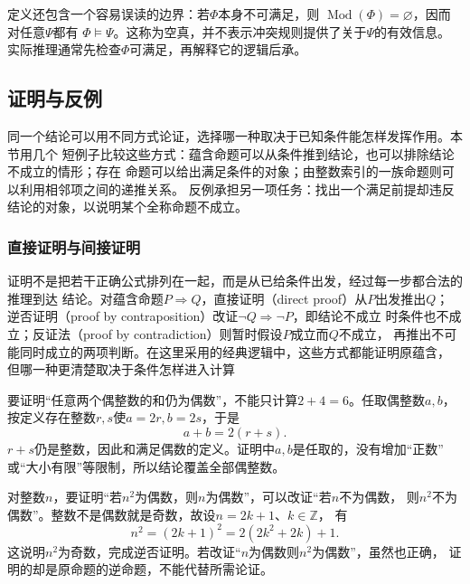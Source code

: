 定义还包含一个容易误读的边界：若$\Phi$本身不可满足，则
$\operatorname{Mod}(\Phi)=\varnothing$，因而对任意$\Psi$都有
$\Phi\models\Psi$。这称为空真，并不表示冲突规则提供了关于$\Psi$的有效信息。
实际推理通常先检查$\Phi$可满足，再解释它的逻辑后承。

\subsection{证明与反例}
\label{sec:prelim-proofs-constructions-counterexamples}

同一个结论可以用不同方式论证，选择哪一种取决于已知条件能怎样发挥作用。本节用几个
短例子比较这些方式：蕴含命题可以从条件推到结论，也可以排除结论不成立的情形；存在
命题可以给出满足条件的对象；由整数索引的一族命题则可以利用相邻项之间的递推关系。
反例承担另一项任务：找出一个满足前提却违反结论的对象，以说明某个全称命题不成立。

\subsubsection{直接证明与间接证明}
\label{sec:prelim-direct-indirect-proofs}

证明不是把若干正确公式排列在一起，而是从已给条件出发，经过每一步都合法的推理到达
结论。对蕴含命题$P\Rightarrow Q$，直接证明（direct proof）从$P$出发推出$Q$；
逆否证明（proof by contraposition）改证$\neg Q\Rightarrow\neg P$，即结论不成立
时条件也不成立；反证法（proof by contradiction）则暂时假设$P$成立而$Q$不成立，
再推出不可能同时成立的两项判断。在这里采用的经典逻辑中，这些方式都能证明原蕴含，
但哪一种更清楚取决于条件怎样进入计算

\begin{example}[从条件直接推出结论]
\label{ex:prelim-direct-even-sum}
要证明“任意两个偶整数的和仍为偶数”，不能只计算$2+4=6$。任取偶整数$a,b$，
按定义存在整数$r,s$使$a=2r,b=2s$，于是
\[
  a+b=2(r+s).
\]
$r+s$仍是整数，因此和满足偶数的定义。证明中$a,b$是任取的，没有增加“正数”
或“大小有限”等限制，所以结论覆盖全部偶整数。
\end{example}

\begin{example}[通过逆否命题证明]
\label{ex:prelim-contrapositive-even-square}
对整数$n$，要证明“若$n^2$为偶数，则$n$为偶数”，可以改证“若$n$不为偶数，
则$n^2$不为偶数”。整数不是偶数就是奇数，故设$n=2k+1$、$k\in\mathbb{Z}$，
有
\[
  n^2=(2k+1)^2=2(2k^2+2k)+1.
\]
这说明$n^2$为奇数，完成逆否证明。若改证“$n$为偶数则$n^2$为偶数”，虽然也正确，
证明的却是原命题的逆命题，不能代替所需论证。
\end{example}

